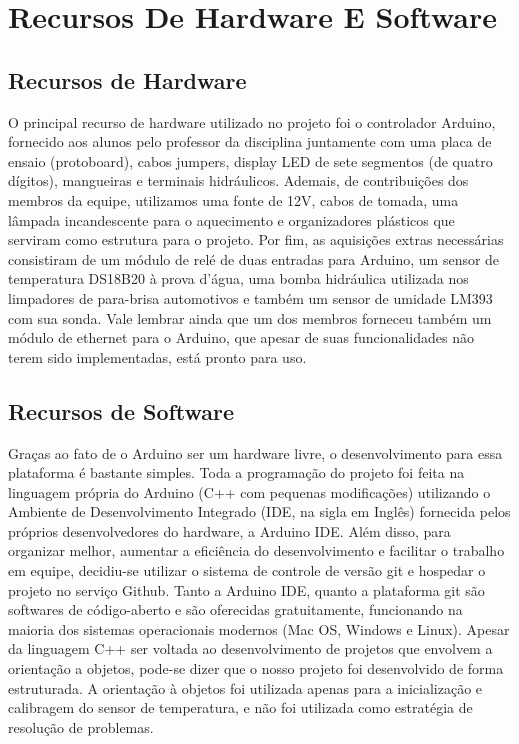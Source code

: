 \documentclass[a4paper,12pt]{article}
\begin{document}
\newpage
\section{Recursos De Hardware E Software}
\subsection{Recursos de Hardware}

O principal recurso de hardware utilizado no projeto foi o controlador Arduino, fornecido aos alunos pelo professor da disciplina juntamente com uma placa de ensaio (protoboard), cabos jumpers, display LED de sete segmentos (de quatro dígitos), mangueiras e terminais hidráulicos. Ademais, de contribuições dos membros da equipe, utilizamos uma fonte de 12V, cabos de tomada, uma lâmpada incandescente para o aquecimento  e organizadores plásticos que serviram como estrutura para o projeto. Por fim, as aquisições extras necessárias consistiram de um módulo de relé de duas entradas para Arduino, um sensor de temperatura DS18B20 à prova d’água, uma bomba hidráulica utilizada nos limpadores de para-brisa automotivos e também um sensor de umidade LM393 com sua sonda. Vale lembrar ainda que um dos membros forneceu também um módulo de ethernet para o Arduino, que apesar de suas funcionalidades não terem sido implementadas, está pronto para uso.

\subsection{Recursos de Software}

Graças ao fato de o Arduino ser um hardware livre, o desenvolvimento para essa plataforma é bastante simples. Toda a programação do projeto foi feita na linguagem própria do Arduino (C++ com pequenas modificações) utilizando o Ambiente de Desenvolvimento Integrado (IDE, na sigla em Inglês) fornecida pelos próprios desenvolvedores do hardware, a Arduino IDE. Além disso, para organizar melhor, aumentar a eficiência do desenvolvimento e facilitar o trabalho em equipe, decidiu-se utilizar o sistema de controle de versão git e hospedar o projeto no serviço Github. Tanto a Arduino IDE, quanto a plataforma git são softwares de código-aberto e são oferecidas gratuitamente, funcionando na maioria dos sistemas operacionais modernos (Mac OS, Windows e Linux).
    Apesar da linguagem C++ ser voltada ao desenvolvimento de projetos que envolvem a orientação a objetos, pode-se dizer que o nosso projeto foi desenvolvido de forma estruturada. A orientação à objetos foi utilizada apenas para a inicialização e calibragem do sensor de temperatura, e não foi utilizada como estratégia de resolução de problemas.
\end{document}
